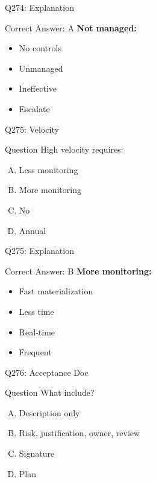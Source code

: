 \documentclass{beamer}
\begin{document}
	\begin{frame}{Q274: Explanation}
		\begin{block}{Correct Answer: A}
			\textbf{Not managed:}
			\begin{itemize}
				\item No controls
				\item Unmanaged
				\item Ineffective
				\item Escalate
			\end{itemize}
		\end{block}
	\end{frame}
	
	\begin{frame}{Q275: Velocity}
		\begin{block}{Question}
			High velocity requires:
		\end{block}
		\begin{enumerate}[(A)]
			\item Less monitoring
			\item More monitoring
			\item No
			\item Annual
		\end{enumerate}
	\end{frame}
	
	\begin{frame}{Q275: Explanation}
		\begin{block}{Correct Answer: B}
			\textbf{More monitoring:}
			\begin{itemize}
				\item Fast materialization
				\item Less time
				\item Real-time
				\item Frequent
			\end{itemize}
		\end{block}
	\end{frame}
	
	\begin{frame}{Q276: Acceptance Doc}
		\begin{block}{Question}
			What include?
		\end{block}
		\begin{enumerate}[(A)]
			\item Description only
			\item Risk, justification, owner, review
			\item Signature
			\item Plan
		\end{enumerate}
	\end{frame}
	
\end{document}
